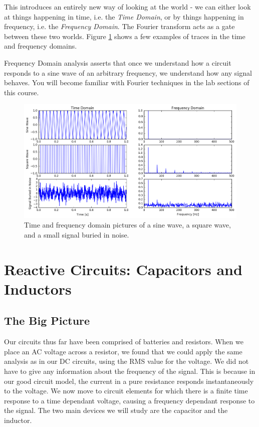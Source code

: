 \documentclass{tufte-book}
\begin{document}
\noindent This introduces an entirely new way of looking at the world - we can either look at things happening in time, i.e. the \textit{Time Domain}, or by things happening in frequency, i.e. the \textit{Frequency Domain}. The Fourier transform acts as a gate between these two worlds. Figure \ref{fig:FourierExamples} shows a few examples of traces in the time and frequency domains.

Frequency Domain analysis asserts that once we understand how a circuit responds to a sine wave of an arbitrary frequency, we understand how any signal behaves. You will become familiar with Fourier techniques in the lab sections of this course.

\begin{figure}[h]
\caption{Time and frequency domain pictures of a sine wave, a square wave, and a small signal buried in noise.}
\label{fig:FourierExamples}
\begin{center}
\includegraphics[width=\textwidth]{FourierExamples}
\end{center}
\end{figure}


\chapter{Reactive Circuits: Capacitors and Inductors}

\section{The Big Picture}

Our circuits thus far have been comprised of batteries and resistors. When we place an AC voltage across a resistor, we found that we could apply the same analysis as in our DC circuits, using the RMS value for the voltage. We did not have to give any information about the frequency of the signal. This is because in our good circuit model, the current in a pure resistance responds instantaneously to the voltage. We now move to circuit elements for which there is a finite time response to a time dependant voltage, causing a frequency dependant response to the signal. The two main devices we will study are the capacitor and the inductor. 
\end{document}
